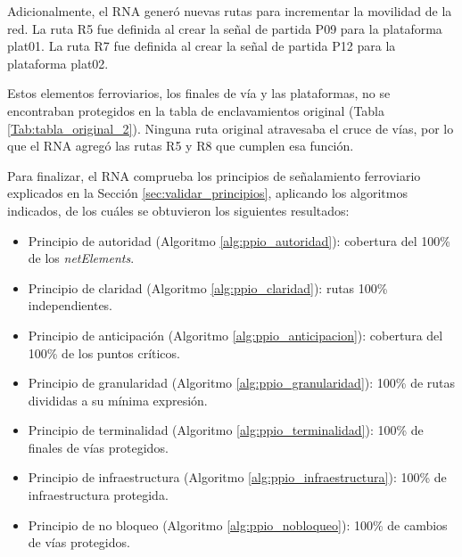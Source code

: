     Adicionalmente, el RNA generó nuevas rutas para incrementar la movilidad de la red. La ruta R5 fue definida al crear la señal de partida P09 para la plataforma plat01. La ruta R7 fue definida al crear la señal de partida P12 para la plataforma plat02.
    
    Estos elementos ferroviarios, los finales de vía y las plataformas, no se encontraban protegidos en la tabla de enclavamientos original (Tabla \ref{Tab:tabla_original_2}). Ninguna ruta original atravesaba el cruce de vías, por lo que el RNA agregó las rutas R5 y R8 que cumplen esa función.
    
    Para finalizar, el RNA comprueba los principios de señalamiento ferroviario explicados en la Sección \ref{sec:validar_principios}, aplicando los algoritmos indicados, de los cuáles se obtuvieron los siguientes resultados:
    
    \begin{itemize}
    	\item Principio de autoridad (Algoritmo \ref{alg:ppio_autoridad}): cobertura del 100\% de los \textit{netElements}.
    	\item Principio de claridad (Algoritmo \ref{alg:ppio_claridad}): rutas 100\% independientes.
    	\item Principio de anticipación (Algoritmo \ref{alg:ppio_anticipacion}): cobertura del 100\% de los puntos críticos.
    	\item Principio de granularidad (Algoritmo \ref{alg:ppio_granularidad}): 100\% de rutas divididas a su mínima expresión.
    	\item Principio de terminalidad (Algoritmo \ref{alg:ppio_terminalidad}): 100\% de finales de vías protegidos.
    	\item Principio de infraestructura (Algoritmo \ref{alg:ppio_infraestructura}): 100\% de infraestructura protegida.
    	\item Principio de no bloqueo (Algoritmo \ref{alg:ppio_nobloqueo}): 100\% de cambios de vías protegidos.
    \end{itemize}	